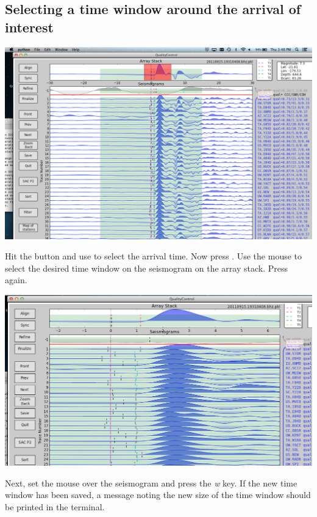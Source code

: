 \documentclass[letterpaper,10pt,english]{sphinxmanual}
\begin{document}
\subsection{Selecting a time window around the arrival of interest}
\label{docfiles/PickingTravelTimes:selecting-a-time-window-around-the-arrival-of-interest}
\includegraphics{selecting-time-window-highlight.png}

Hit the  button and use  to select the arrival time. Now press . Use the mouse to select the desired time window on the seismogram on the array stack. Press  again.

\includegraphics{selected-time-window-t2.png}

Next, set the mouse over the seismogram and press the \emph{w} key. If the new time window has been saved, a message noting the new size of the time window should be printed in the terminal.
\end{document}
